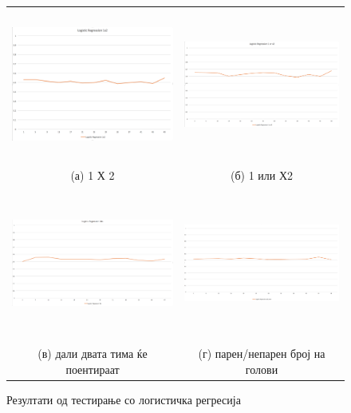 \begin{figure}[H]
\centering
\begin{tabular}{cc}
  \includegraphics[width=8cm,height=5cm]{images/log_reg_1x2.png} &   
  \includegraphics[width=8cm,height=5cm]{images/log_reg_1_or_x2.png} \\
(а) 1 Х 2 & (б) 1 или Х2 \\
 \includegraphics[width=8cm,height=5cm]{images/log_reg_bts.png}
 &   
 \includegraphics[width=8cm,height=5cm]{images/log_reg_odd_even.png} \\
(в) дали двата тима ќе поентираат & (г) парен/непарен број на голови \\
\end{tabular}
\caption{Резултати од тестирање со логистичка регресија}
\label{fig:log_reg}
\end{figure}

